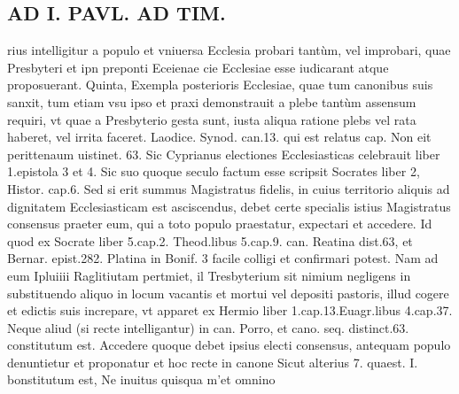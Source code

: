 \documentclass{article}
\begin{document}
\begin{pages}
\section*{AD I. PAVL. AD TIM. }
\marginpar{[ p.513 ]}\pstart rius intelligitur a populo et vniuersa Ecclesia probari tantùm, vel improbari, quae Presbyteri et ipn preponti Eceienae cie Ecclesiae esse iudicarant atque proposuerant.  \pend\pstart Quinta, Exempla posterioris Ecclesiae, quae tum canonibus suis sanxit, tum etiam vsu ipso et praxi demonstrauit a plebe tantùm assensum requiri, vt quae a Presbyterio gesta sunt, iusta aliqua ratione plebs vel rata haberet, vel irrita faceret. Laodice. Synod. can.13. qui est relatus cap. Non eit perittenaum uistinet. 63. Sic Cyprianus electiones Ecclesiasticas celebrauit liber 1.epistola 3 et 4. Sic suo quoque seculo factum esse scripsit Socrates liber 2, Histor. cap.6.  \pend\pstart Sed si erit summus Magistratus fidelis, in cuius territorio aliquis ad dignitatem Ecclesiasticam est asciscendus, debet certe specialis istius Magistratus consensus praeter eum, qui a toto populo praestatur, expectari et accedere. Id quod ex Socrate liber 5.cap.2. Theod.libus 5.cap.9. can. Reatina dist.63, et Bernar. epist.282. Platina in Bonif. 3 facile colligi et confirmari potest. Nam ad eum Ipluiiii Raglitiutam pertmiet, il Tresbyterium sit nimium negligens in substituendo aliquo in locum vacantis et mortui vel depositi pastoris, illud cogere et edictis suis increpare, vt apparet ex Hermio liber 1.cap.13.Euagr.libus 4.cap.37. Neque aliud (si recte intelligantur) in can. Porro, et cano. seq. distinct.63. constitutum est.  \pend\pstart Accedere quoque debet ipsius electi consensus, antequam populo denuntietur et proponatur et hoc recte in canone Sicut alterius 7. quaest. I. bonstitutum est, Ne inuitus quisqua m'et omnino  \pend

\end{pages}
\end{document}
